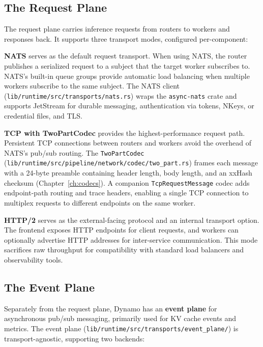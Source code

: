 \subsection{The Request Plane}

The request plane carries inference requests from routers to workers and responses back. It supports three transport modes, configured per-component:

%
\textbf{NATS} serves as the default request transport. When using NATS, the router publishes a serialized request to a subject that the target worker subscribes to. NATS's built-in queue groups provide automatic load balancing when multiple workers subscribe to the same subject. The NATS client (\texttt{lib/runtime/src/transports/nats.rs}) wraps the \texttt{async-nats} crate and supports JetStream for durable messaging, authentication via tokens, NKeys, or credential files, and TLS.

\textbf{TCP with TwoPartCodec} provides the highest-performance request path. Persistent TCP connections between routers and workers avoid the overhead of NATS's pub/sub routing. The \texttt{TwoPartCodec} (\texttt{lib/\allowbreak runtime/\allowbreak src/\allowbreak pipeline/\allowbreak network/\allowbreak codec/\allowbreak two\_part.rs}) frames each message with a 24-byte preamble containing header length, body length, and an xxHash checksum (Chapter~\ref{ch:codecs}). A companion \texttt{TcpRequestMessage} codec adds endpoint-path routing and trace headers, enabling a single TCP connection to multiplex requests to different endpoints on the same worker.

\textbf{HTTP/2} serves as the external-facing protocol and an internal transport option. The frontend exposes HTTP endpoints for client requests, and workers can optionally advertise HTTP addresses for inter-service communication. This mode sacrifices raw throughput for compatibility with standard load balancers and observability tools.

\subsection{The Event Plane}

%
Separately from the request plane, Dynamo has an \textbf{event plane} for asynchronous pub/sub messaging, primarily used for KV cache events and metrics. The event plane (\texttt{lib/\allowbreak runtime/\allowbreak src/\allowbreak transports/\allowbreak event\_plane/}) is transport-agnostic, supporting two backends:

